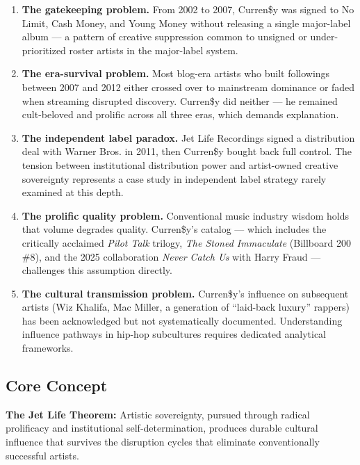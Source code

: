 \documentclass[11pt,letterpaper]{article}
\begin{document}
\begin{enumerate}
  \item \textbf{The gatekeeping problem.} From 2002 to 2007, Curren\$y was signed to No Limit, Cash Money, and Young Money without releasing a single major-label album — a pattern of creative suppression common to unsigned or under-prioritized roster artists in the major-label system.

  \item \textbf{The era-survival problem.} Most blog-era artists who built followings between 2007 and 2012 either crossed over to mainstream dominance or faded when streaming disrupted discovery. Curren\$y did neither — he remained cult-beloved and prolific across all three eras, which demands explanation.

  \item \textbf{The independent label paradox.} Jet Life Recordings signed a distribution deal with Warner Bros. in 2011, then Curren\$y bought back full control. The tension between institutional distribution power and artist-owned creative sovereignty represents a case study in independent label strategy rarely examined at this depth.

  \item \textbf{The prolific quality problem.} Conventional music industry wisdom holds that volume degrades quality. Curren\$y's catalog — which includes the critically acclaimed \textit{Pilot Talk} trilogy, \textit{The Stoned Immaculate} (Billboard 200 \#8), and the 2025 collaboration \textit{Never Catch Us} with Harry Fraud — challenges this assumption directly.

  \item \textbf{The cultural transmission problem.} Curren\$y's influence on subsequent artists (Wiz Khalifa, Mac Miller, a generation of ``laid-back luxury'' rappers) has been acknowledged but not systematically documented. Understanding influence pathways in hip-hop subcultures requires dedicated analytical frameworks.
\end{enumerate}

\subsection{Core Concept}

\textbf{The Jet Life Theorem:} Artistic sovereignty, pursued through radical prolificacy and institutional self-determination, produces durable cultural influence that survives the disruption cycles that eliminate conventionally successful artists.
\end{document}
